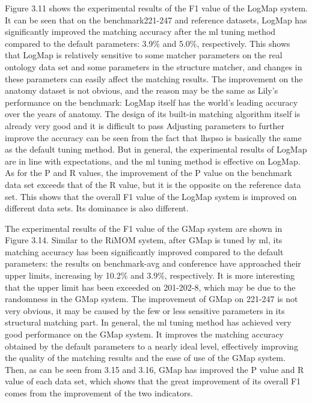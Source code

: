 \documentclass[twoside]{article}
\begin{document}
Figure 3.11 shows the experimental results of the F1 value of the LogMap system.
It can be seen that on the benchmark221-247 and reference datasets, LogMap has significantly improved the matching accuracy after the ml tuning method compared to the default parameters: 3.9\% and 5.0\%, respectively.
This shows that LogMap is relatively sensitive to some matcher parameters on the real ontology data set and some parameters in the structure matcher, and changes in these parameters can easily affect the matching results.
The improvement on the anatomy dataset is not obvious, and the reason may be the same as Lily's performance on the benchmark: LogMap itself has the world's leading accuracy over the years of anatomy. The design of its built-in matching algorithm itself is already very good and it is difficult to pass Adjusting parameters to further improve the accuracy can be seen from the fact that lhspso is basically the same as the default tuning method. But in general, the experimental results of LogMap are in line with expectations, and the ml tuning method is effective on LogMap.
As for the P and R values, the improvement of the P value on the benchmark data set exceeds that of the R value, but it is the opposite on the reference data set. This shows that the overall F1 value of the LogMap system is improved on different data sets. Its dominance is also different.

The experimental results of the F1 value of the GMap system are shown in Figure 3.14.
Similar to the RiMOM system, after GMap is tuned by ml, its matching accuracy has been significantly improved compared to the default parameters: the results on benchmark-avg and conference have approached their upper limits, increasing by 10.2\% and 3.9\%, respectively.
It is more interesting that the upper limit has been exceeded on 201-202-8, which may be due to the randomness in the GMap system.
The improvement of GMap on 221-247 is not very obvious, it may be caused by the few or less sensitive parameters in its structural matching part.
In general, the ml tuning method has achieved very good performance on the GMap system. It improves the matching accuracy obtained by the default parameters to a nearly ideal level, effectively improving the quality of the matching results and the ease of use of the GMap system.
Then, as can be seen from 3.15 and 3.16, GMap has improved the P value and R value of each data set, which shows that the great improvement of its overall F1 comes from the improvement of the two indicators.
\end{document}
